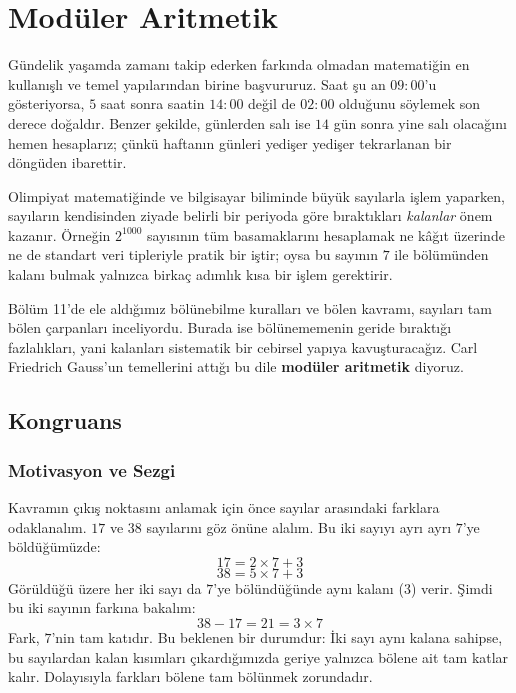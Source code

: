 \chapter[Modüler Aritmetik · \textit{Temel}]{Modüler Aritmetik}

Gündelik yaşamda zamanı takip ederken farkında olmadan matematiğin en kullanışlı ve temel yapılarından birine başvururuz. Saat şu an $09:00$'u gösteriyorsa, $5$ saat sonra saatin $14:00$ değil de $02:00$ olduğunu söylemek son derece doğaldır. Benzer şekilde, günlerden salı ise $14$ gün sonra yine salı olacağını hemen hesaplarız; çünkü haftanın günleri yedişer yedişer tekrarlanan bir döngüden ibarettir.

Olimpiyat matematiğinde ve bilgisayar biliminde büyük sayılarla işlem yaparken, sayıların kendisinden ziyade belirli bir periyoda göre bıraktıkları \emph{kalanlar} önem kazanır. Örneğin $2^{1000}$ sayısının tüm basamaklarını hesaplamak ne kâğıt üzerinde ne de standart veri tipleriyle pratik bir iştir; oysa bu sayının $7$ ile bölümünden kalanı bulmak yalnızca birkaç adımlık kısa bir işlem gerektirir. 

Bölüm 11'de ele aldığımız bölünebilme kuralları ve bölen kavramı, sayıları tam bölen çarpanları inceliyordu. Burada ise bölünememenin geride bıraktığı fazlalıkları, yani kalanları sistematik bir cebirsel yapıya kavuşturacağız. Carl Friedrich Gauss'un temellerini attığı bu dile \textbf{modüler aritmetik} diyoruz.

\section{Kongruans}

\subsection{Motivasyon ve Sezgi}

Kavramın çıkış noktasını anlamak için önce sayılar arasındaki farklara odaklanalım. $17$ ve $38$ sayılarını göz önüne alalım. Bu iki sayıyı ayrı ayrı $7$'ye böldüğümüzde:
\[
17 = 2 \times 7 + 3
\]
\[
38 = 5 \times 7 + 3
\]
Görüldüğü üzere her iki sayı da $7$'ye bölündüğünde aynı kalanı ($3$) verir. Şimdi bu iki sayının farkına bakalım:
\[
38 - 17 = 21 = 3 \times 7
\]
Fark, $7$'nin tam katıdır. Bu beklenen bir durumdur: İki sayı aynı kalana sahipse, bu sayılardan kalan kısımları çıkardığımızda geriye yalnızca bölene ait tam katlar kalır. Dolayısıyla farkları bölene tam bölünmek zorundadır.

